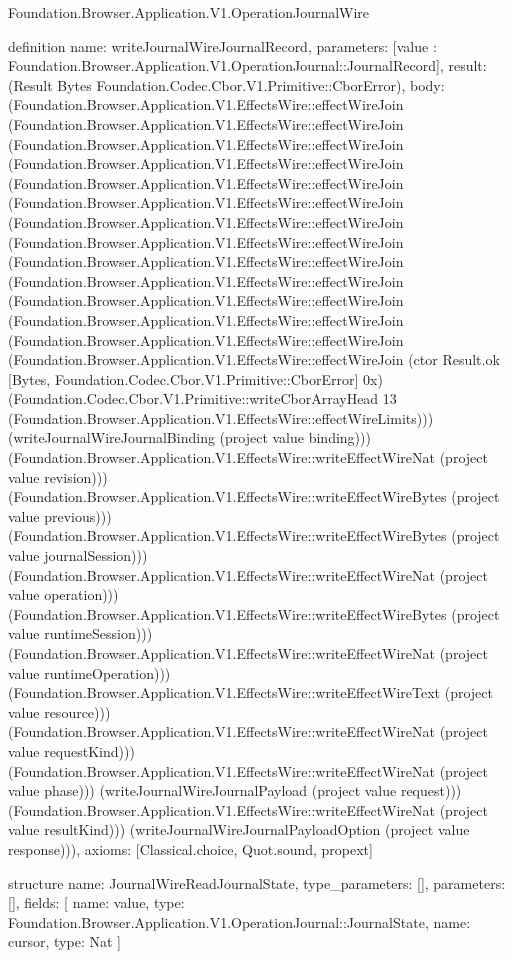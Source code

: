 \begin{lexlean}{Foundation.Browser.Application.V1.OperationJournalWire}
\begin{semanticmodule}
definition{
  name: writeJournalWireJournalRecord,
  parameters: [value : Foundation.Browser.Application.V1.OperationJournal::JournalRecord],
  result: (Result Bytes Foundation.Codec.Cbor.V1.Primitive::CborError),
  body: (Foundation.Browser.Application.V1.EffectsWire::effectWireJoin (Foundation.Browser.Application.V1.EffectsWire::effectWireJoin (Foundation.Browser.Application.V1.EffectsWire::effectWireJoin (Foundation.Browser.Application.V1.EffectsWire::effectWireJoin (Foundation.Browser.Application.V1.EffectsWire::effectWireJoin (Foundation.Browser.Application.V1.EffectsWire::effectWireJoin (Foundation.Browser.Application.V1.EffectsWire::effectWireJoin (Foundation.Browser.Application.V1.EffectsWire::effectWireJoin (Foundation.Browser.Application.V1.EffectsWire::effectWireJoin (Foundation.Browser.Application.V1.EffectsWire::effectWireJoin (Foundation.Browser.Application.V1.EffectsWire::effectWireJoin (Foundation.Browser.Application.V1.EffectsWire::effectWireJoin (Foundation.Browser.Application.V1.EffectsWire::effectWireJoin (Foundation.Browser.Application.V1.EffectsWire::effectWireJoin (ctor Result.ok [Bytes, Foundation.Codec.Cbor.V1.Primitive::CborError] 0x) (Foundation.Codec.Cbor.V1.Primitive::writeCborArrayHead 13 (Foundation.Browser.Application.V1.EffectsWire::effectWireLimits))) (writeJournalWireJournalBinding (project value binding))) (Foundation.Browser.Application.V1.EffectsWire::writeEffectWireNat (project value revision))) (Foundation.Browser.Application.V1.EffectsWire::writeEffectWireBytes (project value previous))) (Foundation.Browser.Application.V1.EffectsWire::writeEffectWireBytes (project value journalSession))) (Foundation.Browser.Application.V1.EffectsWire::writeEffectWireNat (project value operation))) (Foundation.Browser.Application.V1.EffectsWire::writeEffectWireBytes (project value runtimeSession))) (Foundation.Browser.Application.V1.EffectsWire::writeEffectWireNat (project value runtimeOperation))) (Foundation.Browser.Application.V1.EffectsWire::writeEffectWireText (project value resource))) (Foundation.Browser.Application.V1.EffectsWire::writeEffectWireNat (project value requestKind))) (Foundation.Browser.Application.V1.EffectsWire::writeEffectWireNat (project value phase))) (writeJournalWireJournalPayload (project value request))) (Foundation.Browser.Application.V1.EffectsWire::writeEffectWireNat (project value resultKind))) (writeJournalWireJournalPayloadOption (project value response))),
  axioms: [Classical.choice, Quot.sound, propext]
}

structure{
  name: JournalWireReadJournalState,
  type_parameters: [],
  parameters: [],
  fields: [
    {name: value, type: Foundation.Browser.Application.V1.OperationJournal::JournalState},
    {name: cursor, type: Nat}
  ]
}


\end{semanticmodule}
\end{lexlean}
